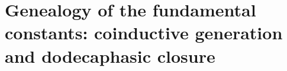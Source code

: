 



\part{Genealogy of the fundamental constants: coinductive generation and dodecaphasic closure}






